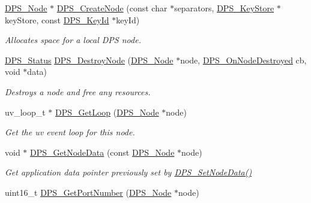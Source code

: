 \begin{DoxyCompactItemize}
\item 
\hyperlink{group__node_ga4dd612ab965134321bb57fdb065f121c}{D\+P\+S\+\_\+\+Node} $\ast$ \hyperlink{group__node_gaf6641b5bbf27b2c45ac7f926b0ce4efe}{D\+P\+S\+\_\+\+Create\+Node} (const char $\ast$separators, \hyperlink{group__keystore_gaf3833cfe48f848f698514bc5daa075fa}{D\+P\+S\+\_\+\+Key\+Store} $\ast$key\+Store, const \hyperlink{group__keystore_ga4345e29dd2ad5d7fd88a1e988787bd72}{D\+P\+S\+\_\+\+Key\+Id} $\ast$key\+Id)
\begin{DoxyCompactList}\small\item\em Allocates space for a local D\+PS node. \end{DoxyCompactList}\item 
\hyperlink{group__status_ga30395a84d3cad9d4ec29848106415038}{D\+P\+S\+\_\+\+Status} \hyperlink{group__node_ga85f5121f80411f5ab82449efe20b68dd}{D\+P\+S\+\_\+\+Destroy\+Node} (\hyperlink{group__node_ga4dd612ab965134321bb57fdb065f121c}{D\+P\+S\+\_\+\+Node} $\ast$node, \hyperlink{group__node_ga1e88cc9ca744782e36d58a022fe026c5}{D\+P\+S\+\_\+\+On\+Node\+Destroyed} cb, void $\ast$data)
\begin{DoxyCompactList}\small\item\em Destroys a node and free any resources. \end{DoxyCompactList}\item 
uv\+\_\+loop\+\_\+t $\ast$ \hyperlink{group__node_ga7dacebc6533305fba12335b3b8c817dc}{D\+P\+S\+\_\+\+Get\+Loop} (\hyperlink{group__node_ga4dd612ab965134321bb57fdb065f121c}{D\+P\+S\+\_\+\+Node} $\ast$node)
\begin{DoxyCompactList}\small\item\em Get the uv event loop for this node. \end{DoxyCompactList}\item 
void $\ast$ \hyperlink{group__node_ga65bba7bcfe5e940b153fcced4e2e8880}{D\+P\+S\+\_\+\+Get\+Node\+Data} (const \hyperlink{group__node_ga4dd612ab965134321bb57fdb065f121c}{D\+P\+S\+\_\+\+Node} $\ast$node)
\begin{DoxyCompactList}\small\item\em Get application data pointer previously set by \hyperlink{group__node_gad19cf4272ba11e935654175c83db2ce1}{D\+P\+S\+\_\+\+Set\+Node\+Data()} \end{DoxyCompactList}\item 
uint16\+\_\+t \hyperlink{group__node_gaf920b28fe0721a7f97b11673494d7b36}{D\+P\+S\+\_\+\+Get\+Port\+Number} (\hyperlink{group__node_ga4dd612ab965134321bb57fdb065f121c}{D\+P\+S\+\_\+\+Node} $\ast$node)

\end{DoxyCompactItemize}
